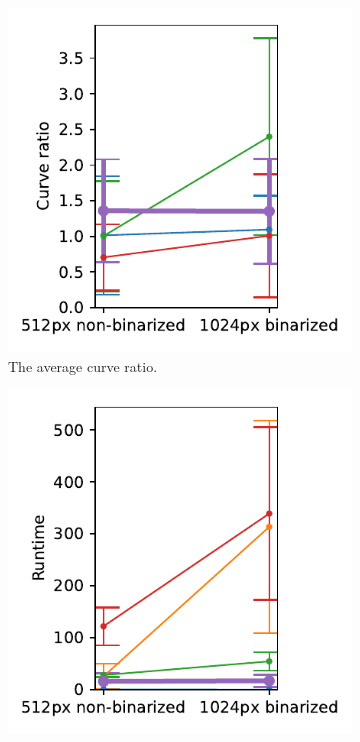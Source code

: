 \begin{figure}[h]
\begin{subfigure}{.3\textwidth}
    \includegraphics[width=\textwidth]{graphics/eval/curve ratio_res_binarization_sketchbench.pdf}
    \caption{The average curve ratio.}
\end{subfigure}
    \begin{subfigure}{.3\textwidth}
    \centering
    \includegraphics[width=\textwidth]{graphics/eval/runtime_res_binarization_sketchbench.pdf}

\end{subfigure}
\end{figure}
